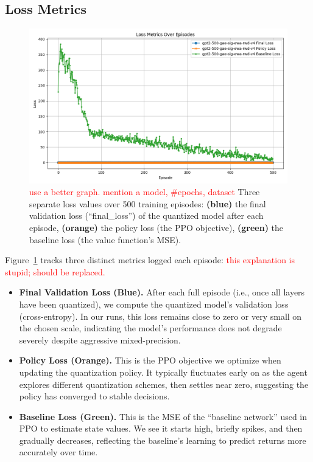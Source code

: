 \documentclass{article}
\newcommand{\red}[1]{\textcolor{red}{#1}}
\begin{document}
	\subsection{Loss Metrics}
	\begin{figure}[ht]
		\centering
		\includegraphics[width=\columnwidth]{gpt2-500-gae-sig-ewa-rwd-v4-losses.png}
		\vspace{-1em}
		\caption{\small
			\red{use a better graph. mention a model, \#epochs, dataset}
			Three separate loss values over 500 training episodes:
			\textbf{(blue)} the final validation loss (``final\_loss'') of the quantized model after each episode,
			\textbf{(orange)} the policy loss (the PPO objective),
			\textbf{(green)} the baseline loss (the value function’s MSE).}
		\label{fig:loss_curves}
		\vspace{-0.2em}
	\end{figure}
	
	Figure~\ref{fig:loss_curves} tracks three distinct metrics logged each episode:
	\red{this explanation is stupid; should be replaced.}
	\begin{itemize}
		\item \textbf{Final Validation Loss (Blue).} 
		After each full episode (i.e., once all layers have been quantized), we compute the quantized model's validation loss (cross-entropy). 
		In our runs, this loss remains close to zero or very small on the chosen scale, indicating the model’s performance does not degrade severely despite aggressive mixed-precision.
		
		\item \textbf{Policy Loss (Orange).} 
		This is the PPO objective we optimize when updating the quantization policy. 
		It typically fluctuates early on as the agent explores different quantization schemes, then settles near zero, suggesting the policy has converged to stable decisions.
		
		\item \textbf{Baseline Loss (Green).}		
		This is the MSE of the “baseline network” used in PPO to estimate state values. 
		We see it starts high, briefly spikes, and then gradually decreases, reflecting the baseline’s learning to predict returns more accurately over time.
	\end{itemize}
	
\end{document}
